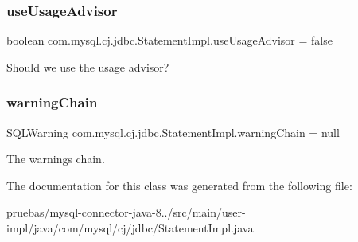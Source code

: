 \subsubsection{\texorpdfstring{use\+Usage\+Advisor}{useUsageAdvisor}}
{\footnotesize\ttfamily boolean com.\+mysql.\+cj.\+jdbc.\+Statement\+Impl.\+use\+Usage\+Advisor = false\hspace{0.3cm}{\ttfamily [protected]}}

Should we use the usage advisor? \mbox{\label{classcom_1_1mysql_1_1cj_1_1jdbc_1_1_statement_impl_a33a86beb6f375456f45c42eef969d0bc}} 
\subsubsection{\texorpdfstring{warning\+Chain}{warningChain}}
{\footnotesize\ttfamily S\+Q\+L\+Warning com.\+mysql.\+cj.\+jdbc.\+Statement\+Impl.\+warning\+Chain = null\hspace{0.3cm}{\ttfamily [protected]}}

The warnings chain. 

The documentation for this class was generated from the following file\+:\begin{DoxyCompactItemize}
\item 
pruebas/mysql-\/connector-\/java-\/8../src/main/user-\/impl/java/com/mysql/cj/jdbc/Statement\+Impl.\+java\end{DoxyCompactItemize}
